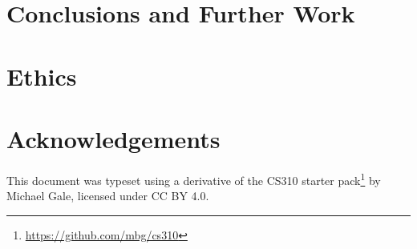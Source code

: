 \documentclass[a4paper,fleqn,12pt]{article}
\begin{document}
\section{Conclusions and Further Work}\label{id:h.fc67ipatea73}

\section{Ethics}\label{id:h.i0n8c6hqdr6j}

\section{Acknowledgements}\label{id:h.xqaef57orpsv}

This document was typeset using a derivative of the CS310 starter pack\footnote{\href{https://github.com/mbg/cs310}{https://github.com/mbg/cs310}} by Michael Gale, licensed under CC BY 4.0.




\end{document}
